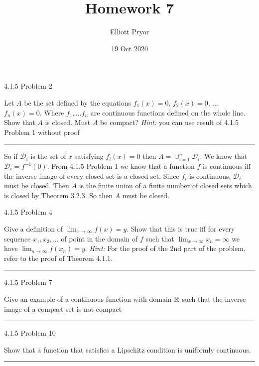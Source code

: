 \documentclass[11pt]{article}
\title{Homework 7}
\author{Elliott Pryor}
\date{19 Oct 2020}
\begin{document}
\maketitle

 4.1.5 Problem 2

Let $A$ be the set defined by the equations $f_1(x) = 0$, $f_2(x) = 0$, ... $f_n(x) = 0$. Where $f_1, ... f_n$ are continuous functions defined on the whole line. Show that $A$ is closed. Must $A$ be compact? \textit{Hint: } you can use result of 4.1.5 Problem 1 without proof
\hrule

So if $\mathcal{D}_i$ is the set of $x$ satisfying $f_i(x) = 0$ then $A = \cup_{i = 1}^n \mathcal{D}_i$. We know that $\mathcal{D}_i = f^{-1}(0)$. 
From 4.1.5 Problem 1 we know that a function $f$ is continuous iff the inverse image of every closed set is a closed set. Since $f_i$ is continuous, $\mathcal{D}_i$ must be closed. 
Then $A$ is the finite union of a finite number of closed sets which is closed by Theorem 3.2.3. So then $A$ must be closed.   



\newpage
{} 4.1.5 Problem 4

Give a definition of $\lim_{x \to \infty} f(x) = y$. Show that this is true iff for every sequence $x_1, x_2, ...$ of point in the domain of $f$ such that $\lim_{x\to \infty} x_n = \infty$ we have $\lim_{n\to \infty} f(x_n) = y$. \textit{Hint: } For the proof of the 2nd part of the problem, refer to the proof of Theorem 4.1.1.
\hrule

\newpage
{} 4.1.5 Problem 7

Give an example of a continuous function with domain $\mathbb{R}$ such that the inverse image of a compact set is not compact

\hrule

\newpage
{} 4.1.5 Problem 10

Show that a function that satisfies a Lipschitz condition is uniformly continuous.
\hrule
\end{document}
